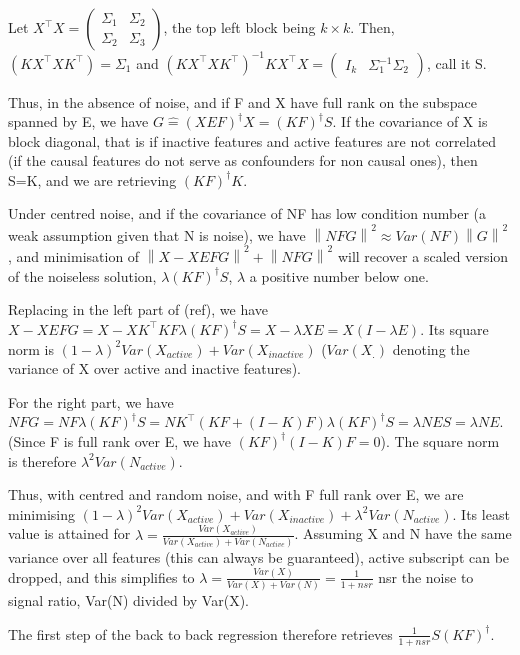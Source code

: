 \documentclass{article}
\begin{document}
Let $X^\top X = \left(\begin{array}{c|c}\Sigma_{1} & \Sigma_{2} \\\hline \Sigma_{2} & \Sigma_{3}\end{array}\right)$, the top left block being $k\times k$. Then, $(KX^\top X K^\top)=\Sigma_{1}$ and $(KX^\top XK^\top)^{-1} KX^\top X=\left(\begin{array}{cc}I_{k} &  \Sigma_{1}^{-1} \Sigma_{2}\end{array}\right)$, call it S.

Thus, in the absence of noise, and if F and X have full rank on the subspace spanned by E, we have $G\hat=(XEF)^\dagger X=(KF)^\dagger S$. If the covariance of X is block diagonal, that is if inactive features and active features are not correlated (if the causal features do not serve as confounders for non causal ones), then S=K, and we are retrieving $(KF)^\dagger K$.

Under centred noise, and if the covariance of NF has low condition number (a weak assumption given that N is noise), we have $\left \| NFG\right \| ^2 \approx Var(NF) \left \| G\right \| ^2$, and minimisation of $\left \| X-XEFG\right\| ^2  + \left \| NFG\right \| ^2$ will recover a scaled version of the noiseless solution, $\lambda (KF)^\dagger S$, $\lambda$ a positive number below one.

Replacing in the left part of (ref), we have $X-XEFG=X- XK^\top KF \lambda (KF)^\dagger S= X - \lambda XE=X(I-\lambda E)$. Its square norm is $(1-\lambda)^2 Var(X_{active}) + Var(X_{inactive})$ ($Var(X_{.})$ denoting the variance of X over active and inactive features).

For the right part, we have $NFG=NF \lambda (KF)^\dagger S = NK^\top (KF+(I-K)F) \lambda  (KF)^\dagger S = \lambda NES=  \lambda NE$. (Since F is full rank over E, we have $(KF)^\dagger (I-K)F= 0$). The square norm is therefore $\lambda^2 Var(N_{active})$.

Thus, with centred and random noise, and with F full rank over E, we are minimising $(1-\lambda)^2 Var(X_{active}) + Var(X_{inactive})+\lambda^2 Var(N_{active})$. Its least value is attained for $\lambda = \frac{Var(X_{active})}{Var(X_{active})+Var(N_{active})}$. Assuming X and N have the same variance over all features (this can always be guaranteed), active subscript can be dropped, and this simplifies to $\lambda= \frac {Var(X)}{Var(X)+ Var(N)}=\frac{1}{1+nsr}$ nsr the noise to signal ratio, Var(N) divided by Var(X).

The first step of the back to back regression therefore retrieves $\frac{1}{1+nsr} S (KF)^\dagger$.
\end{document}
